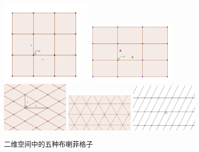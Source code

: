 \begin{figure}[htbp]
    \centering
\includegraphics[width=0.4\textwidth]{./pic/p008-1.png}
\includegraphics[width=0.4\textwidth]{./pic/p008-2.png}
\includegraphics[width=0.3\textwidth]{./pic/p008-3.png}
\includegraphics[width=0.3\textwidth]{./pic/p008-4.png}
\includegraphics[width=0.3\textwidth]{./pic/p008-5.png}

\caption{二维空间中的五种布喇菲格子}

\label{dogp08}
\end{figure}
% 





